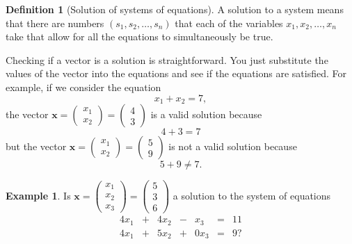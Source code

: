 \documentclass[
]{book}
\theoremstyle{definition}
\newtheorem{definition}{Definition}[chapter]
\theoremstyle{definition}
\newtheorem{example}{Example}[chapter]
\theoremstyle{definition}
\theoremstyle{definition}
\theoremstyle{remark}
\begin{document}
\begin{definition}[Solution of systems of equations]
A solution to a system means that there are numbers \((s_1, s_2, \ldots, s_n)\) that each of the variables \(x_1, x_2, \ldots, x_n\) take that allow for all the equations to simultaneously be true.
\end{definition}

Checking if a vector is a solution is straightforward. You just substitute the values of the vector into the equations and see if the equations are satisfied. For example, if we consider the equation
\[
x_1 + x_2 = 7,
\]
the vector \(\mathbf{x} = \begin{pmatrix} x_1 \\ x_2 \end{pmatrix} = \begin{pmatrix} 4 \\ 3 \end{pmatrix}\) is a valid solution because
\[
4 + 3 = 7
\]
but the vector \(\mathbf{x} = \begin{pmatrix} x_1 \\ x_2 \end{pmatrix} = \begin{pmatrix} 5 \\ 9 \end{pmatrix}\) is not a valid solution because
\[
5 + 9 \neq 7.
\]

\begin{example}
Is \(\mathbf{x} = \begin{pmatrix} x_1 \\ x_2 \\ x_3 \end{pmatrix} = \begin{pmatrix} 5 \\ 3 \\ 6 \end{pmatrix}\) a solution to the system of equations
\begin{alignat*}{4}
x_1   & {}+{} & 4 x_2 & {}-{} & x_3 & {}={} & 11 \\
4 x_1 & {}+{} & 5 x_2 & {}+{} & 0 x_3 & {}={} & 9?
\end{alignat*}
\end{example}
\end{document}
